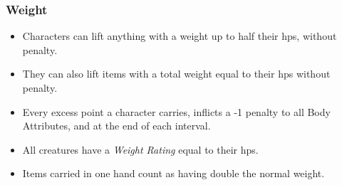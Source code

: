 \subsubsection*{Weight}

\begin{itemize}
  \item
  Characters can lift anything with a \gls{weight} up to half their \glspl{hp}, without penalty.
  \item
  They can also lift items with a total \gls{weight} equal to their \glspl{hp} without penalty.
  \item
  Every excess point a character carries, inflicts a -1 penalty to all Body Attributes, and  at the end of each \gls{interval}.
  \item
  All creatures have a \textit{Weight Rating} equal to their \glspl{hp}.
  \item
  Items carried in one hand count as having double the normal \gls{weight}.
\end{itemize}
